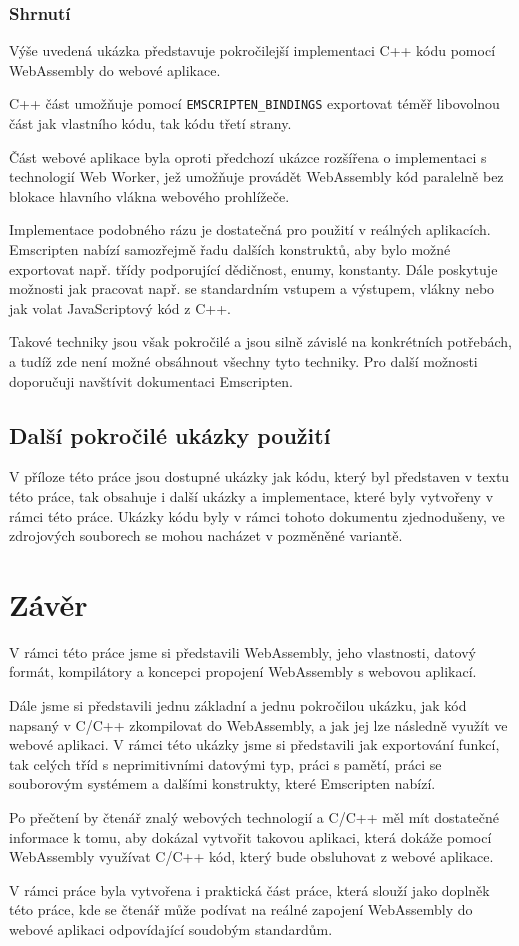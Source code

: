 \documentclass{{template/ctuthesis}}
\begin{document}
\subsection{Shrnutí}

Výše uvedená ukázka představuje pokročilejší implementaci C++ kódu pomocí WebAssembly do webové aplikace.

C++ část umožňuje pomocí \texttt{EMSCRIPTEN\_BINDINGS} exportovat téměř libovolnou část jak vlastního kódu, tak kódu třetí strany.

Část webové aplikace byla oproti předchozí ukázce rozšířena o implementaci s technologií Web Worker, jež umožňuje provádět WebAssembly kód paralelně bez blokace hlavního vlákna webového prohlížeče.

Implementace podobného rázu je dostatečná pro použití v reálných aplikacích. Emscripten nabízí samozřejmě řadu dalších konstruktů, aby bylo možné exportovat např. třídy podporující dědičnost, enumy, konstanty. Dále poskytuje možnosti jak pracovat např. se standardním vstupem a výstupem, vlákny nebo jak volat JavaScriptový kód z C++.

Takové techniky jsou však pokročilé a jsou silně závislé na konkrétních potřebách, a tudíž zde není možné obsáhnout všechny tyto techniky. Pro další možnosti doporučuji navštívit dokumentaci Emscripten.


\section{Další pokročilé ukázky použití}

V příloze této práce jsou dostupné ukázky jak kódu, který byl představen v textu této práce, tak obsahuje i další ukázky a implementace, které byly vytvořeny v rámci této práce. Ukázky kódu byly v rámci tohoto dokumentu zjednodušeny, ve zdrojových souborech se mohou nacházet v pozměněné variantě.


\chapter{Závěr}

V rámci této práce jsme si představili WebAssembly, jeho vlastnosti, datový formát, kompilátory a koncepci propojení WebAssembly s webovou aplikací.

Dále jsme si představili jednu základní a jednu pokročilou ukázku, jak kód napsaný v C/C++ zkompilovat do WebAssembly, a jak jej lze následně využít ve webové aplikaci. V rámci této ukázky jsme si představili jak exportování funkcí, tak celých tříd s neprimitivními datovými typ, práci s pamětí, práci se souborovým systémem a dalšími konstrukty, které Emscripten nabízí.

Po přečtení by čtenář znalý webových technologií a C/C++ měl mít dostatečné informace k tomu, aby dokázal vytvořit takovou aplikaci, která dokáže pomocí WebAssembly využívat C/C++ kód, který bude obsluhovat z webové aplikace.

V rámci práce byla vytvořena i praktická část práce, která slouží jako doplněk této práce, kde se čtenář může podívat na reálné zapojení WebAssembly do webové aplikaci odpovídající soudobým standardům.



\end{document}
